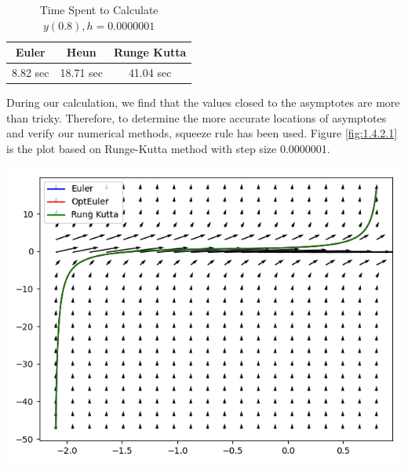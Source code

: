 \documentclass[11pt,a4paper]{article}
\begin{document}
\begin{table}[H]
	\begin{center}
		\small
		\begin{tabular}{c|c|c}
			\renewcommand{\multirowsetup}{\centering}
			Euler			&Heun			&Runge Kutta	\\
			\hline
			8.82 sec		&18.71 sec		&41.04 sec		\\
		\end{tabular}
		\setlength{\abovecaptionskip}{0.1cm}
		\setlength{\belowcaptionskip}{-0.9cm}
		\caption{Time Spent to Calculate $y(0.8), h = 0.0000001$} \label{tab:tab1.4.2.1}
	\end{center}
\end{table}

During our calculation, we find that the values closed to the asymptotes are more than tricky. Therefore, to determine the more accurate locations of asymptotes and verify our numerical methods, squeeze rule has been used. Figure \ref{fig:1.4.2.1} is the plot based on Runge-Kutta method with step size 0.0000001.

\begin{center}
	\includegraphics[scale=0.3]{P1FinalSolution.png}\label{fig:1.4.2.1}
\end{center}
\end{document}
